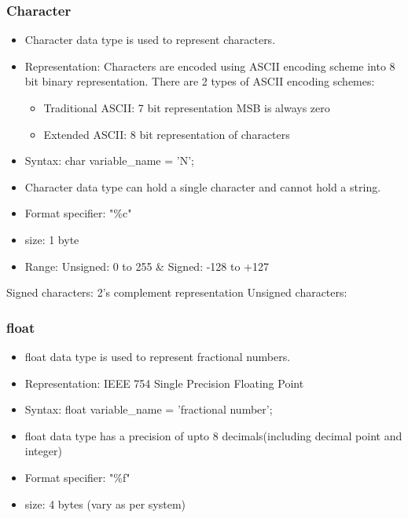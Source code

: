 \subsubsection{Character}
\begin{itemize}
    \item Character data type is used to represent characters.
    \item Representation: Characters are encoded using ASCII encoding scheme into 8 bit binary representation. There are 2 types of ASCII encoding schemes:
    \begin{itemize}
        \item Traditional ASCII: 7 bit representation MSB is always zero
        \item Extended ASCII: 8 bit representation of characters
    \end{itemize}
    \item Syntax: char variable\_name = 'N';
    \item Character data type can hold a single character and cannot hold a string.
    \item Format specifier: "\%c"
    \item size: 1 byte
    \item Range: Unsigned: 0 to 255 \& Signed: -128 to +127
\end{itemize}

Signed characters: 2's complement representation
Unsigned characters:

\subsubsection{float}
\begin{itemize}
    \item float data type is used to represent fractional numbers.
    \item Representation: IEEE 754 Single Precision Floating Point
    \item Syntax: float variable\_name = 'fractional number';
    \item float data type has a precision of upto 8 decimals(including decimal point and integer)
    \item Format specifier: "\%f"
    \item size: 4 bytes (vary as per system)
\end{itemize}


